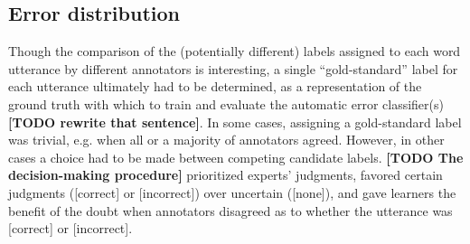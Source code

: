 \documentclass[a4paper]{article}
\newcommand{\TODO}[1]{{\color{red}\textbf{[TODO #1]}}}
\begin{document}
	

		
		
		
		
			
		
		
		\subsection{Error distribution}
		\label{sec:data:errors}
		
		Though the comparison of the (potentially different) labels assigned to each word utterance by different annotators is interesting, a single ``gold-standard'' label for each utterance ultimately had to be determined, as a representation of the ground truth with which to train and evaluate the automatic error classifier(s) \TODO{rewrite that sentence}.
		In some cases, assigning a gold-standard label was trivial, e.g. when all or a majority of annotators agreed. However, in other cases a choice had to be made between competing candidate labels. 
		\TODO{The decision-making procedure} prioritized experts' judgments, favored certain  judgments ([correct] or [incorrect]) over uncertain ([none]), and gave learners the benefit of the doubt when annotators disagreed as to whether the utterance was [correct] or [incorrect].
	
\end{document}
